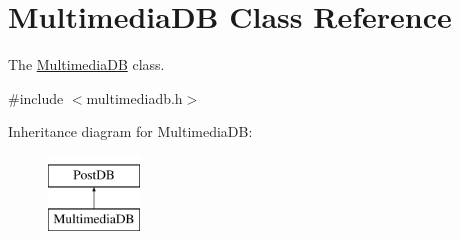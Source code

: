 \hypertarget{classMultimediaDB}{}\section{Multimedia\+DB Class Reference}
\label{classMultimediaDB}


The \hyperlink{classMultimediaDB}{Multimedia\+DB} class.  




{\ttfamily \#include $<$multimediadb.\+h$>$}

Inheritance diagram for Multimedia\+DB\+:\begin{figure}[H]
\begin{center}
\leavevmode
\includegraphics[height=2.000000cm]{classMultimediaDB}
\end{center}
\end{figure}

